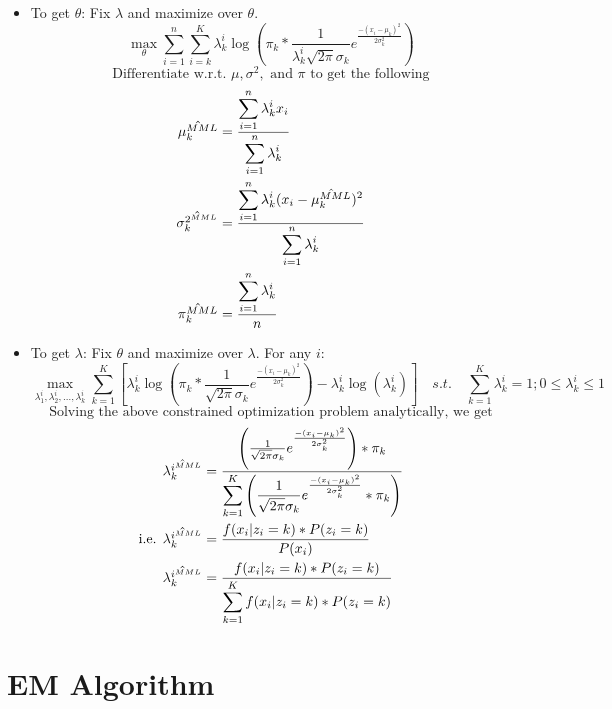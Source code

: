 \documentclass[
]{article}
\providecommand{\tightlist}{%
  \setlength{\itemsep}{0pt}\setlength{\parskip}{0pt}}
\begin{document}
\begin{itemize}
\tightlist
\item
  To get \(\theta\): Fix \(\lambda\) and maximize over \(\theta\). \[
  \underset{\theta} {\max} \sum _{i=1} ^n \sum _{i=k} ^K \lambda _k ^i \log \left ( \pi_k * \frac{1}{\lambda _k ^i\sqrt{2\pi}\sigma_k} e^{\frac{-(x_i-\mu_k)^2}{2\sigma^2_k}} \right )
  \] \[
  \text{Differentiate w.r.t. }\mu,\sigma^2,\text{ and }\pi \text{ to get the following}
  \] \begin{align*}
  \hat{\mu_k^{\scriptsize{MML}}} &= \frac{\displaystyle\sum _{i=1} ^n \lambda_k^i x_i}{\displaystyle\sum _{i=1} ^n \lambda_k^i} \\
  \hat{\sigma_k^{2^{\scriptsize{MML}}}} &= \frac{\displaystyle\sum _{i=1} ^n \lambda_k^i (x_i-\hat{\mu_k^{\scriptsize{MML}}})^2}{\displaystyle\sum _{i=1} ^n \lambda_k^i} \\
  \hat{\pi_k^{\scriptsize{MML}}} &= \frac{\displaystyle\sum _{i=1} ^n \lambda_k^i}{n} \\
  \end{align*}
\item
  To get \(\lambda\): Fix \(\theta\) and maximize over \(\lambda\). For
  any \(i\): \[
  \underset{\lambda_1^i, \lambda_2^i, \ldots, \lambda_k^i} {\max} 
  \sum _{k=1} ^K \left [ \lambda _k ^i \log \left ( \pi_k * \frac{1}{\sqrt{2\pi}\sigma_k} e^{\frac{-(x_i-\mu_k)^2}{2\sigma^2_k}} \right ) -  \lambda _k ^i \log( \lambda _k ^i) \right ] \hspace{1em} s.t. \hspace{1em} \sum _{k=1} ^K \lambda _k ^i = 1;  0 \le \lambda _k ^i \le 1
  \] \[
  \text{Solving the above constrained optimization problem analytically, we get}
  \] \begin{align*}
  \hat{\lambda_k^{i^{\scriptsize{MML}}}}
  &= \frac{\left ( \frac{1}{\sqrt{2\pi}\sigma_k} e^{\frac{-(x_i-\mu_k)^2}{2\sigma^2_k}} \right ) * \pi_k}{ \displaystyle \sum _{k=1} ^K \left ( \frac{1}{\sqrt{2\pi}\sigma_k} e^{\frac{-(x_i-\mu_k)^2}{2\sigma^2_k}} * \pi_k \right )} \\
  \text{i.e. }\hat{\lambda_k^{i^{\scriptsize{MML}}}}
  &= \frac{f(x_i|z_i=k)*P(z_i=k)}{P(x_i)} \\
  \hat{\lambda_k^{i^{\scriptsize{MML}}}}
  &= \frac{f(x_i|z_i=k)*P(z_i=k)}{\displaystyle \sum _{k=1} ^K f(x_i|z_i=k)*P(z_i=k)} \\
  \end{align*}
\end{itemize}

\hypertarget{em-algorithm}{%
\section{EM Algorithm}\label{em-algorithm}}
\end{document}

